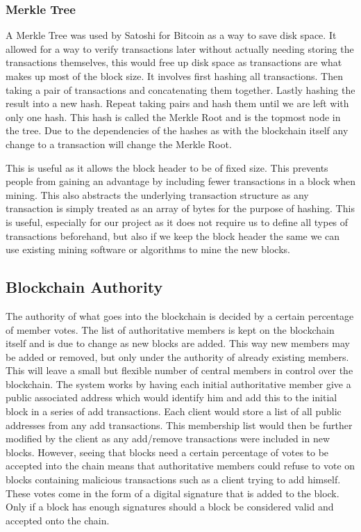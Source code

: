 \documentclass[12pt]{article}
\begin{document}
\subsubsection{Merkle Tree}\label{subsubsec:merkle_tree}

A Merkle Tree was used by Satoshi for Bitcoin as a way to save disk space. It allowed for a way to verify transactions later without actually needing storing the transactions themselves, this would free up disk space as transactions are what makes up most of the block size. It involves first hashing all transactions. Then taking a pair of transactions and concatenating them together. Lastly hashing the result into a new hash. Repeat taking pairs and hash them until we are left with only one hash. This hash is called the Merkle Root and is the topmost node in the tree. Due to the dependencies of the hashes as with the blockchain itself any change to a transaction will change the Merkle Root.


This is useful as it allows the block header to be of fixed size. This prevents people from gaining an advantage by including fewer transactions in a block when mining. This also abstracts the underlying transaction structure as any transaction is simply treated as an array of bytes for the purpose of hashing. This is useful, especially for our project as it does not require us to define all types of transactions beforehand, but also if we keep the block header the same we can use existing mining software or algorithms to mine the new blocks.
\subsection{Blockchain Authority}\label{subsec:authority}

The authority of what goes into the blockchain is decided by a certain percentage of member votes. The list of authoritative members is kept on the blockchain itself and is due to change as new blocks are added. This way new members may be added or removed, but only under the authority of already existing members. This will leave a small but flexible number of central members in control over the blockchain. The system works by having each initial authoritative member give a public associated address which would identify him and add this to the initial block in a series of add transactions. Each client would store a list of all public addresses from any add transactions. This membership list would then be further modified by the client as any add/remove transactions were included in new blocks. However, seeing that blocks need a certain percentage of votes to be accepted into the chain means that authoritative members could refuse to vote on blocks containing malicious transactions such as a client trying to add himself. These votes come in the form of a digital signature that is added to the block. Only if a block has enough signatures should a block be considered valid and accepted onto the chain. 
\end{document}
